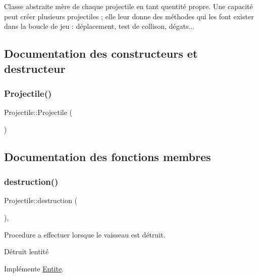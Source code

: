 Classe abstraite mère de chaque projectile en tant qu\textquotesingle{}entité propre. Une capacité peut créer plusieurs projectiles ; elle leur donne des méthodes qui les font exister dans la boucle de jeu \+: déplacement, test de collison, dégats... 

\subsection{Documentation des constructeurs et destructeur}
\mbox{\label{class_projectile_ac536ed2aad56af866a2078b9a85aa16d}} 
\subsubsection{\texorpdfstring{Projectile()}{Projectile()}}
{\footnotesize\ttfamily Projectile\+::\+Projectile (\begin{DoxyParamCaption}{ }\end{DoxyParamCaption})\hspace{0.3cm}{\ttfamily [inline]}}



\subsection{Documentation des fonctions membres}
\mbox{\label{class_projectile_aac0afd5bf761f0e212d4e1c8a503c86a}} 
\subsubsection{\texorpdfstring{destruction()}{destruction()}}
{\footnotesize\ttfamily Projectile\+::destruction (\begin{DoxyParamCaption}{ }\end{DoxyParamCaption})\hspace{0.3cm}{\ttfamily [inline]}, {\ttfamily [virtual]}}



Procedure a effectuer lorsque le vaisseau est détruit. 

Détruit l\textquotesingle{}entité 

Implémente \hyperlink{class_entite_af5c424f69b2c880ae9c12786abd28592}{Entite}.

